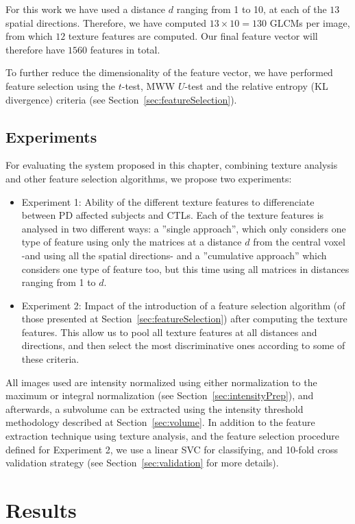 For this work we have used a distance $d$ ranging from 1 to 10, at each of the $13$ spatial directions. Therefore, we have computed $13\times10=130$ \acp{GLCM} per image, from which $12$ texture features are computed. Our final feature vector will therefore have $1560$ features in total. 

To further reduce the dimensionality of the feature vector, we have performed feature selection using the $t$-test, \ac{MWW} $U$-test and the relative entropy (\ac{KL} divergence) criteria (see Section~\ref{sec:featureSelection}). 

\subsection{Experiments}
For evaluating the system proposed in this chapter, combining texture analysis and other feature selection algorithms, we propose two experiments: 
\begin{itemize}
	\item Experiment 1: Ability of the different texture features to differenciate between \ac{PD} affected subjects and \acp{CTL}. Each of the texture features is analysed in two different ways: a ''single approach'', which only considers one type of feature using only the matrices at a distance $d$ from the central voxel -and using all the spatial directions- and a ''cumulative approach'' which considers one type of feature too, but this time using all matrices in distances ranging from 1 to $d$. 
	\item Experiment 2: Impact of the introduction of a feature selection algorithm (of those presented at Section~\ref{sec:featureSelection}) after computing the texture features. This allow us to pool all texture features at all distances and directions, and then select the most discriminative ones according to some of these criteria.  
\end{itemize}

All images used are intensity normalized using either normalization to the maximum or integral normalization (see Section~\ref{sec:intensityPrep}), and afterwards, a subvolume can be extracted using the intensity threshold methodology described at Section~\ref{sec:volume}. In addition to the feature extraction technique using texture analysis, and the feature selection procedure defined for Experiment 2, we use a linear \ac{SVC} for classifying, and 10-fold cross validation strategy (see Section~\ref{sec:validation} for more details). 

\section{Results}\label{sec:ch5results}
